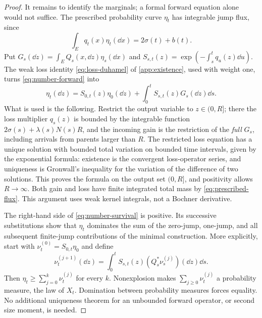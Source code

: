 \begin{proof}
It remains to identify the marginals; a formal forward equation alone
would not suffice. The prescribed probability curve $\eta_t$ has
integrable jump flux, since
\begin{equation}
 \int_E q_t(x)\eta_t(\dd x)=2\sigma(t)+b(t).
 \label{eq:prescribed-flux}
\end{equation}
Put $G_s(\dd z)=\int_E Q_s(x,\dd z)\eta_s(\dd x)$ and
$S_{s,t}(z)=\exp(-\int_s^t q_u(z)\dd u)$. The weak loss identity
\eqref{eq:loss-duhamel} of \cref{app:existence}, used with weight
one, turns \eqref{eq:number-forward} into
\begin{equation}
 \eta_t(\dd z)=S_{0,t}(z)\eta_0(\dd z)
       +\int_0^t S_{s,t}(z)G_s(\dd z)\dd s.
 \label{eq:number-survival}
\end{equation}
What is used is the following. Restrict the output variable to
$z\in(0,R]$; there the loss multiplier $q_s(z)$ is bounded by the
integrable function $2\sigma(s)+\lambda(s)N(s)R$, and the incoming
gain is the restriction of the \emph{full} $G_s$, including arrivals
from parents larger than $R$. The restricted loss equation has a
unique solution with bounded total variation on bounded time
intervals, given by the exponential formula: existence is the
convergent loss-operator series, and uniqueness is Gronwall's
inequality for the variation of the difference of two solutions.
This proves the formula on the output set $(0,R]$, and positivity
allows $R\to\infty$. Both gain and loss have finite integrated
total mass by \eqref{eq:prescribed-flux}. This argument uses weak
kernel integrals, not a Bochner derivative.

The right-hand side of \eqref{eq:number-survival} is positive.
Its successive substitutions show that $\eta_t$ dominates the sum of
the zero-jump, one-jump, and all subsequent finite-jump contributions
of the minimal construction. More explicitly, start with
$\nu_t^{(0)}=S_{0,t}\eta_0$ and define
\[
 \nu_t^{(j+1)}(\dd z)=\int_0^t S_{s,t}(z)
                 (Q_s^*\nu_s^{(j)})(\dd z)\dd s.
\]
Then $\eta_t\geq\sum_{j=0}^k\nu_t^{(j)}$ for every $k$.
Nonexplosion makes $\sum_{j\geq0}\nu_t^{(j)}$ a probability measure,
the law of $X_t$. Domination between probability measures forces
equality. No additional uniqueness theorem for an unbounded forward
operator, or second size moment, is needed.
\end{proof}

